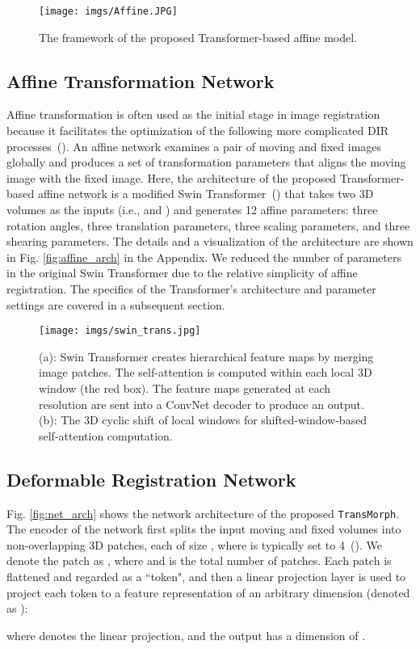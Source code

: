 \documentclass[times,twocolumn,final]{elsarticle}
\begin{document}
\begin{figure}[!h]
\centering
\texttt{[image: imgs/Affine.JPG]}
\caption{The framework of the proposed Transformer-based affine model.}
\end{figure}
\subsection{Affine Transformation Network}

Affine transformation is often used as the initial stage in image registration because it facilitates the optimization of the following more complicated DIR processes~(\cite{de2019deep}). An affine network examines a pair of moving and fixed images globally and produces a set of transformation parameters that aligns the moving image with the fixed image. Here, the architecture of the proposed Transformer-based affine network is a modified Swin Transformer~(\cite{liu2021swin}) that takes two 3D volumes as the inputs (i.e.,  and ) and generates 12 affine parameters: three rotation angles, three translation parameters, three scaling parameters, and three shearing parameters. The details and a visualization of the architecture are shown in Fig. \ref{fig:affine_arch} in the Appendix. We reduced the number of parameters in the original Swin Transformer due to the relative simplicity of affine registration. The specifics of the Transformer's architecture and parameter settings are covered in a subsequent section.
\begin{figure*}[!h]
\centering
\texttt{[image: imgs/swin\_trans.jpg]}
\caption{(a): Swin Transformer creates hierarchical feature maps by merging image patches. The self-attention is computed within each local 3D window (the red box). The feature maps generated at each resolution are sent into a ConvNet decoder to produce an output. (b): The 3D cyclic shift of local windows for shifted-window-based self-attention computation. \label{fig:swin_feat}}
\end{figure*}
\subsection{Deformable Registration Network}
\label{sec:reg_net}
Fig. \ref{fig:net_arch} shows the network architecture of the proposed \texttt{TransMorph}. The encoder of the network first splits the input moving and fixed volumes into non-overlapping 3D patches, each of size , where  is typically set to 4~(\cite{dosovitskiy2020image,liu2021swin,dong2021cswin}). We denote the  patch as , where  and  is the total number of patches. Each patch is flattened and regarded as a ``token", and then a linear projection layer is used to project each token to a feature representation of an arbitrary dimension (denoted as ):
\begin{linenomath}

\end{linenomath}
where  denotes the linear projection, and the output  has a dimension of . 
\end{document}
